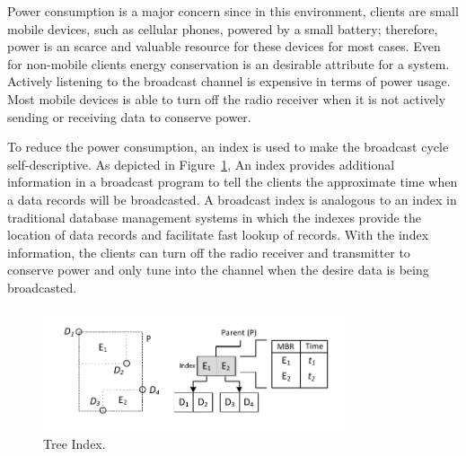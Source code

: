 \documentclass{sig-alternate}
\begin{document}
Power consumption is a major concern since in this environment, clients
are small mobile devices, such as cellular phones, powered by a small battery;
therefore, power is an scarce and valuable resource for these devices for
most cases. Even for non-mobile clients energy conservation is an desirable
attribute for a system. Actively listening to the broadcast channel is
expensive in terms of power usage. Most mobile devices is able to turn off
the radio receiver when it is not actively sending or receiving data to
conserve power.

To reduce the power consumption, an index is used to make the broadcast
cycle self-descriptive. As depicted in Figure~\ref{fig:index_node}, An
index provides additional
information in a broadcast program to tell the clients the
approximate time when a data records will be broadcasted. A
broadcast index is analogous to an index in traditional database
management systems in which the indexes provide the location of data
records and facilitate fast lookup of records. With the index
information, the clients can turn off the radio receiver and
transmitter to conserve power and only tune into the channel when the
desire data is being broadcasted.


\begin{figure}[h]
\begin{center}
\includegraphics[width=3.5in]{Figures/index_node.pdf}
\caption{\small Tree Index.
\label{fig:index_node}}
\end{center}
\end{figure}
\end{document}
